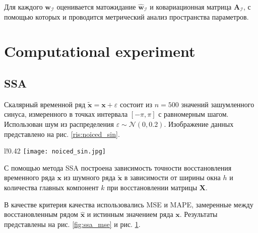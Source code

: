 \documentclass[12pt, twoside]{article}
\begin{document}
Для каждого $\mathbf{w}_{\mathcal{I}}$ оценивается матожидание $\hat{\mathbf{w}}_{\mathcal{I}}$ и ковариационная матрица $\mathbf{A}_{\mathcal{I}}$, с помощью которых и проводится метрический анализ пространства параметров.


\section{Computational experiment}
\subsection{SSA}
Скалярный временной ряд $\mathbf{\tilde{x}} = \mathbf{x} + \varepsilon$ состоит из $n=500$ значений зашумленного синуса, измеренного в точках интервала $[-\pi, \pi]$ с равномерным шагом. Использован шум из распределения $\varepsilon \sim \mathcal{N}(0, 0.2)$. Изображение данных представлено на рис. \ref{ris:noiced_sin}.

\begin{wrapfigure}{l!}{0.42\textwidth}
\texttt{[image: noiced\_sin.jpg]}
\caption{Зашумленный синус.}
\label{ris:noiced_sin}
\end{wrapfigure}

С помощью метода SSA построена зависимость точности восстановления временного ряда $\mathbf{x}$ из шумного ряда $\mathbf{\tilde{x}}$ в зависимости от ширины окна $h$ и количества главных компонент $k$ при восстановлении матрицы $\mathbf{X}$.

В качестве критерия качества использовались MSE и MAPE, замеренные между восстановленным рядом $\mathbf{\hat{x}}$ и истинным значением ряда $\mathbf{x}$. Результаты представлены на рис. \ref{fig:ssa_mse} и рис. \ref{fig:ssa_mape}.

\captionsetup[subfigure]{labelsep=colon}

\begin{figure}[ht]%
    \centering
    \label{fig:ssa_mse}%
    \qquad
    \label{fig:ssa_mape}%
\end{figure}
\end{document}
